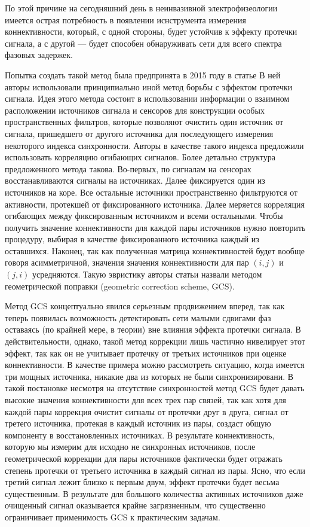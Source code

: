 По этой причине на сегодняшний день в неинвазивной электрофизеологии имеется острая 
потребность в появлении иснструмента измерения коннективности, который, с одной стороны, 
будет устойчив к эффекту протечки сигнала, а с другой --- будет способен обнаруживать сети 
для всего спектра фазовых задержек.


Попытка создать такой метод была предпринята в 2015 году в статье
В ней авторы использовали принципиально иной метод борьбы с эффектом протечки сигнала.
Идея этого метода состоит в использовании информации
о взаимном расположении источников сигнала и сенсоров для конструкции особых пространственных
фильтров, которые позволяют очистить один источник
от сигнала, пришедшего от другого источника для последующего измерения
некоторого индекса синхронности. Авторы в качестве такого индекса предложили использовать корреляцию огибающих сигналов. Более детально структура
предложенного метода такова. Во-первых, по сигналам на сенсорах восстанавливаются сигналы на источниках.
Далее фиксируется один из источников на коре.
Все остальные источники пространственно фильтруются от активности, протекшей от фиксированного источника.
Далее меряется корреляция огибающих между фиксированным источником и всеми остальными.
Чтобы получить значение коннективности для каждой пары источников нужно повторить процедуру, выбирая
в качестве фиксированного источника каждый из оставшихся.
Наконец, так как полученная матрица коннективностей будет вообще говоря асимметричной, значения 
значения коннективности для пар $(i,j)$ и $(j,i)$ усредняются. Такую эвристику авторы статьи назвали 
методом геометрической поправки (geometric correction scheme, GCS).

Метод GCS концептуально явился серьезным продвижением вперед, так как теперь 
появилась возможность детектировать сети малыми сдвигами фаз 
оставаясь (по крайней мере, в теории) вне влияния эффекта протечки сигнала. 
В действительности, однако, такой метод коррекции лишь частично нивелирует этот эффект,
так как он не учитывает протечку от третьих источников при оценке коннективности. В качестве примера 
можно рассмотреть ситуацию, когда имеется три мощных источника,
никакие два из которых не были синхронизировани.
В такой постановке несмотря на отсутствие синхронностей метод GCS будет давать высокие значения коннективности 
для всех трех пар связей, так как хотя для каждой пары коррекция очистит сигналы от протечки друг в друга, 
сигнал от третего источника, протекая в каждый источник из пары, создаст общую компоненту в восстановленных источниках. 
В результате коннективность, которую мы измерим для исходно не синхронных 
источников, после геометрической коррекции для пары источников фактически будет отражать степень протечки 
от третьего источника в каждый сигнал из пары. Ясно, что если третий сигнал лежит близко к первым двум, 
эффект протечки будет весьма существенным. В результате для большого количества активных источников
даже очищенный сигнал оказывается крайне загрязненным, что существенно ограничивает применимость GCS к 
практическим задачам.



